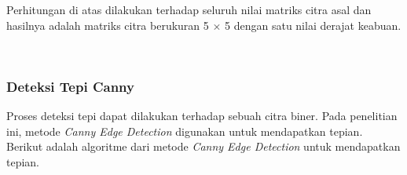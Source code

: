 \noindent Perhitungan di atas dilakukan terhadap seluruh nilai matriks citra asal dan hasilnya adalah matriks citra berukuran 5 $\times$ 5 dengan satu nilai derajat keabuan.

\begin{adjustbox}{width=1\textwidth}
	\noindent\begin{minipage}{\linewidth}
		\label{fig:MatriksCitraGrayscale}
	\end{minipage}
\end{adjustbox} \\

\subsubsection{Deteksi Tepi Canny}
\noindent Proses deteksi tepi dapat dilakukan terhadap sebuah citra biner. Pada penelitian ini, metode \textit{Canny Edge Detection} digunakan untuk mendapatkan tepian. Berikut adalah algoritme dari metode \textit{Canny Edge Detection} untuk mendapatkan tepian.

